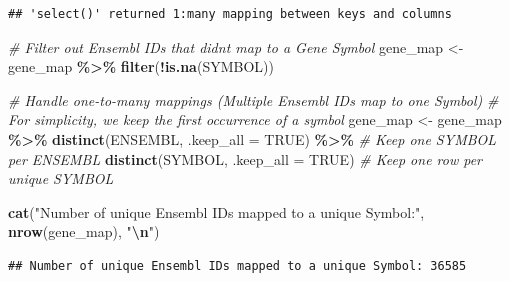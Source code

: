 \documentclass[
]{article}
\newenvironment{Shaded}{\begin{snugshade}}{\end{snugshade}}
\newcommand{\AttributeTok}[1]{\textcolor[rgb]{0.13,0.29,0.53}{#1}}
\newcommand{\CommentTok}[1]{\textcolor[rgb]{0.56,0.35,0.01}{\textit{#1}}}
\newcommand{\ConstantTok}[1]{\textcolor[rgb]{0.56,0.35,0.01}{#1}}
\newcommand{\FunctionTok}[1]{\textcolor[rgb]{0.13,0.29,0.53}{\textbf{#1}}}
\newcommand{\NormalTok}[1]{#1}
\newcommand{\OtherTok}[1]{\textcolor[rgb]{0.56,0.35,0.01}{#1}}
\newcommand{\SpecialCharTok}[1]{\textcolor[rgb]{0.81,0.36,0.00}{\textbf{#1}}}
\newcommand{\StringTok}[1]{\textcolor[rgb]{0.31,0.60,0.02}{#1}}
\begin{document}
\begin{verbatim}
## 'select()' returned 1:many mapping between keys and columns
\end{verbatim}

\begin{Shaded}
\begin{Highlighting}[]
\CommentTok{\# Filter out Ensembl IDs that didn\textquotesingle{}t map to a Gene Symbol}
\NormalTok{gene\_map }\OtherTok{\textless{}{-}}\NormalTok{ gene\_map }\SpecialCharTok{\%\textgreater{}\%} \FunctionTok{filter}\NormalTok{(}\SpecialCharTok{!}\FunctionTok{is.na}\NormalTok{(SYMBOL))}

\CommentTok{\# Handle one{-}to{-}many mappings (Multiple Ensembl IDs map to one Symbol)}
\CommentTok{\# For simplicity, we keep the first occurrence of a symbol}
\NormalTok{gene\_map }\OtherTok{\textless{}{-}}\NormalTok{ gene\_map }\SpecialCharTok{\%\textgreater{}\%}
  \FunctionTok{distinct}\NormalTok{(ENSEMBL, }\AttributeTok{.keep\_all =} \ConstantTok{TRUE}\NormalTok{) }\SpecialCharTok{\%\textgreater{}\%} \CommentTok{\# Keep one SYMBOL per ENSEMBL}
  \FunctionTok{distinct}\NormalTok{(SYMBOL, }\AttributeTok{.keep\_all =} \ConstantTok{TRUE}\NormalTok{) }\CommentTok{\# Keep one row per unique SYMBOL}

\FunctionTok{cat}\NormalTok{(}\StringTok{"Number of unique Ensembl IDs mapped to a unique Symbol:"}\NormalTok{, }\FunctionTok{nrow}\NormalTok{(gene\_map), }\StringTok{"}\SpecialCharTok{\textbackslash{}n}\StringTok{"}\NormalTok{)}
\end{Highlighting}
\end{Shaded}

\begin{verbatim}
## Number of unique Ensembl IDs mapped to a unique Symbol: 36585
\end{verbatim}

\begin{Shaded}
\end{Shaded}
\end{document}
